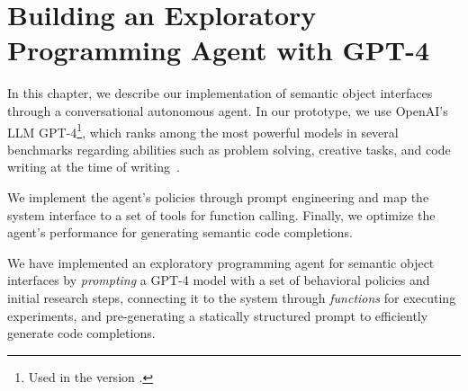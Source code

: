 
\chapter{Building an Exploratory Programming Agent with GPT-4}
\label{cha:agent}

In this chapter, we describe our implementation of semantic object interfaces through a conversational autonomous agent.
In our prototype, we use OpenAI's LLM GPT-4\footnote{Used in the version .}, which ranks among the most powerful models in several benchmarks regarding abilities such as problem solving, creative tasks, and code writing at the time of writing~\cite{borji2023battle,chiang2024chatbot}.

We implement the agent's policies through prompt engineering and map the system interface to a set of tools for function calling.
Finally, we optimize the agent's performance for generating semantic code completions.



\begin{summary}
	We have implemented an exploratory programming agent for semantic object interfaces by \emph{prompting} a GPT-4 model with a set of behavioral policies and initial research steps, connecting it to the system through \emph{functions} for executing experiments, and pre-generating a statically structured prompt to efficiently generate code completions.
\end{summary}

